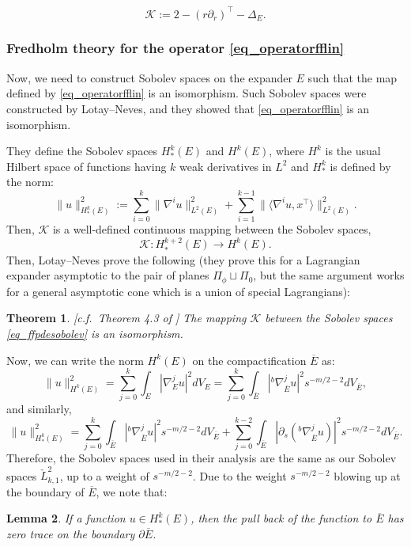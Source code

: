 \documentclass[10pt, a4paper]{article}
\theoremstyle{plain}%
\newtheorem{theorem}{Theorem}[section]
\newtheorem{lem}[theorem]{Lemma}
\theoremstyle{definition}
\numberwithin{figure}{section}
\numberwithin{equation}{section}
\newcommand{\la}{\langle}
\newcommand{\ra}{\rangle}
\newcommand{\pa}{\partial}
\newcommand{\rt}{\rightarrow}
\newcommand{\oE}{{\overline{E}}}
\newcommand{\chL}{\check{L}}
\newcommand{\cK}{\mathcal{K}}
\begin{document}
\begin{equation}\label{eq_operatorfflin}
	\cK := 2 - (r\pa_r)^\top -\Delta_E.
\end{equation}


\subsubsection{Fredholm theory for the operator \eqref{eq_operatorfflin}}\label{subsubsec_LNanalysis}
Now, we need to construct Sobolev spaces on the expander $E$ such that the map defined by \eqref{eq_operatorfflin} is an isomorphism. Such Sobolev spaces were constructed by Lotay--Neves, and they showed that \eqref{eq_operatorfflin} is an isomorphism. 


They define the Sobolev spaces $H^k_*(E)$ and $H^k(E)$, where $H^k$ is the usual Hilbert space of functions having $k$ weak derivatives in $L^2$ and $H^k_*$ is defined by the norm:\[
\|u\|^2_{H^k_*(E)}:= \sum_{i=0}^k\|\nabla^iu\|^2_{L^2(E)}+\sum_{i=1}^{k-1}\|\la \nabla^iu, x^\top\ra\|^2_{L^2(E)}.
\] 
Then, $\cK$ is a well-defined continuous mapping between the Sobolev spaces, 
\begin{equation}\label{eq_ffpdesobolev}
	\cK: H^{k+2}_*(E)\rt H^k(E).
\end{equation}
Then, Lotay--Neves prove the following (they prove this for a Lagrangian expander asymptotic to the pair of planes $\Pi_\phi\sqcup \Pi_0$, but the same argument works for a general asymptotic cone which is a union of special Lagrangians):
\begin{theorem}\label{eq_fredholmff}[c.f.\ Theorem 4.3 of \cite{LN13}]
	The mapping $\cK$ between the Sobolev spaces \eqref{eq_ffpdesobolev} is an isomorphism.
\end{theorem}

Now, we can write the norm $H^k(E)$ on the compactification $\oE$ as:
\[
\|u\|^2_{H^k(E)} = \sum_{j=0}^k \int_{E}|\nabla^j_Eu|^2dV_E = \sum_{j=0}^k \int_{\oE}|^b\nabla^j_{\oE}u|^2s^{-m/2-2}dV_\oE,
\]
and similarly,
\[
\|u\|^2_{H^k_*(E)} = \sum_{j=0}^k \int_\oE |^b\nabla^j_{\oE}u|^2s^{-m/2-2}dV_\oE + \sum_{j=0}^{k-2} \int_{\oE}|\pa_s(^b\nabla^j_{\oE}u)|^2s^{-m/2-2}dV_\oE.
\]
Therefore, the Sobolev spaces used in their analysis are the same as our Sobolev spaces $\chL^2_{k,1}$, up to a weight of $s^{-m/2-2}$. Due to the weight $s^{-m/2-2}$ blowing up at the boundary of $\oE$, we note that:
\begin{lem}
	If a function $u\in H^k_*(E)$, then the pull back of the function to $\oE$ has zero trace on the boundary $\pa\oE$.
\end{lem}
\end{document}
